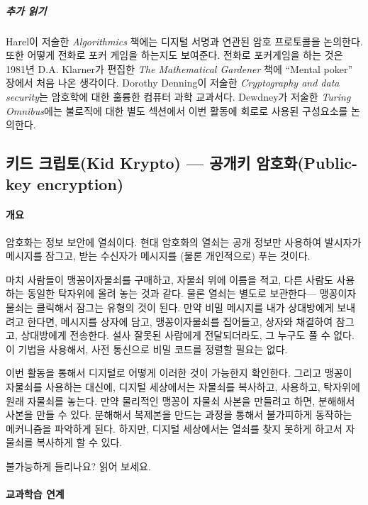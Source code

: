 \documentclass[]{article}
\begin{document}
\subparagraph{추가 읽기}\label{section-245}

Harel이 저술한 \emph{Algorithmics} 책에는 디지털 서명과 연관된 암호
프로토콜을 논의한다. 또한 어떻게 전화로 포커 게임을 하는지도 보여준다.
전화로 포커게임을 하는 것은 1981년 D.A. Klarner가 편집한 \emph{The
Mathematical Gardener} 책에 ``Mental poker'' 장에서 처음 나온 생각이다.
Dorothy Denning이 저술한 \emph{Cryptography and data security}는
암호학에 대한 훌륭한 컴퓨터 과학 교과서다. Dewdney가 저술한 \emph{Turing
Omnibus}에는 불로직에 대한 별도 섹션에서 이번 활동에 회로로 사용된
구성요소를 논의한다.

\subsection{키드 크립토(Kid Krypto) --- 공개키 암호화(Public-key
encryption)}\label{kid-krypto-mdash--public-key-encryption}

\mbox{}\paragraph{개요}\label{section-246}

암호화는 정보 보안에 열쇠이다. 현대 암호화의 열쇠는 공개 정보만 사용하여
발시자가 메시지를 잠그고, 받는 수신자가 메시지를 (물론 개인적으로) 푸는
것이다.

마치 사람들이 맹꽁이자물쇠를 구매하고, 자물쇠 위에 이름을 적고, 다른
사람도 사용하는 동일한 탁자위에 올려 놓는 것과 같다. 물론 열쇠는 별도로
보관한다--- 맹꽁이자물쇠는 클릭해서 잠그는 유형의 것이 된다. 만약 비밀
메시지를 내가 상대방에게 보내려고 한다면, 메시지를 상자에 담고,
맹꽁이자물쇠를 집어들고, 상자와 채결하여 참그고, 상대방에게 전송한다.
설사 잘못된 사람에게 전달되더라도, 그 누구도 풀 수 없다. 이 기법을
사용해서, 사전 통신으로 비밀 코드를 정렬할 필요는 없다.

이번 활동을 통해서 디지털로 어떻게 이러한 것이 가능한지 확인한다. 그리고
맹꽁이 자물쇠를 사용하는 대신에, 디지털 세상에서는 자물쇠를 복사하고,
사용하고, 탁자위에 원래 자물쇠를 놓는다. 만약 물리적인 맹꽁이 자물쇠
사본을 만들려고 하면, 분해해서 사본을 만들 수 있다. 분해해서 복제본을
만드는 과정을 통해서 불가피하게 동작하는 메커니즘을 파악하게 된다.
하지만, 디지털 세상에서는 열쇠를 찾지 못하게 하고서 자물쇠를 복사하게 할
수 있다.

불가능하게 들리나요? 읽어 보세요.

\mbox{}\paragraph{교과학습 연계}\label{section-247}
\end{document}
